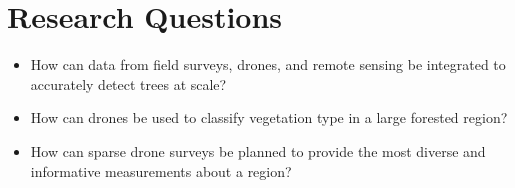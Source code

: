 
\chapter{Research Questions} \label{chapResearchQuestion}

\begin{itemize}
    \item How can data from field surveys, drones, and remote sensing be integrated to accurately detect trees at scale?
\end{itemize}
\begin{itemize}
    \item How can drones be used to classify vegetation type in a large forested region?
\end{itemize}
\begin{itemize}
    \item How can sparse drone surveys be planned to provide the most diverse and informative measurements about a region?
\end{itemize}